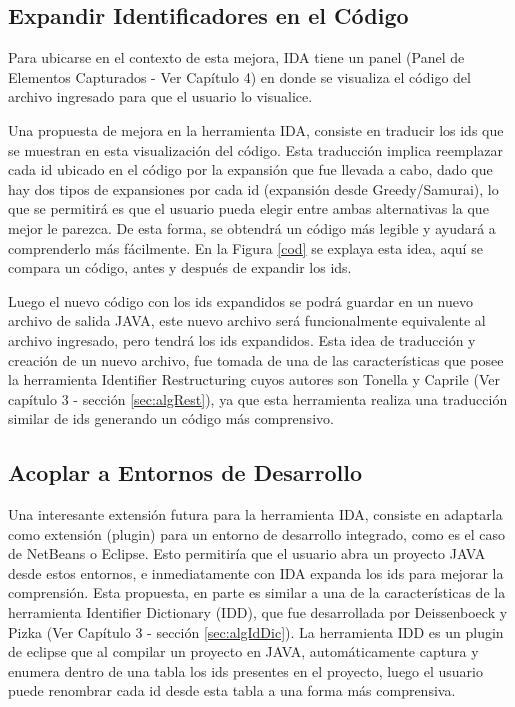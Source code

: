 \subsection{Expandir Identificadores en el Código}

Para ubicarse en el contexto de esta mejora, IDA tiene un panel (Panel de Elementos Capturados - Ver Capítulo 4) en donde se visualiza el código del archivo ingresado para que el usuario lo visualice. 


Una propuesta de mejora en la herramienta IDA, consiste en traducir los ids que se muestran en esta visualización del código.
Esta traducción implica reemplazar cada id ubicado en el código por la expansión que fue llevada a cabo, dado que hay dos tipos de expansiones por cada id (expansión desde Greedy/Samurai), lo que se permitirá es que el usuario pueda elegir entre ambas alternativas la que mejor le parezca. De esta forma, se obtendrá un código más legible y ayudará a comprenderlo más fácilmente. En la Figura \ref{cod} se explaya esta idea, aquí se compara un código, antes y después de expandir los ids.

Luego el nuevo código con los ids expandidos se podrá guardar en un nuevo archivo de salida JAVA, este nuevo archivo será funcionalmente equivalente al archivo ingresado, pero tendrá los ids expandidos. Esta idea de traducción y creación de un nuevo archivo, fue tomada de una de las características que posee la herramienta Identifier Restructuring cuyos autores son Tonella y Caprile (Ver capítulo 3 - sección \ref{sec:algRest}), ya que esta herramienta realiza una traducción similar de ids generando un código más comprensivo.

\subsection{Acoplar a Entornos de Desarrollo}

Una interesante extensión futura para la herramienta IDA, consiste en adaptarla como extensión (plugin) para un entorno de desarrollo integrado, como es el caso de NetBeans o Eclipse. Esto permitiría que el usuario abra un proyecto JAVA desde estos entornos, e inmediatamente con IDA expanda los ids para mejorar la comprensión. Esta propuesta, en parte es similar a una de la características de la herramienta Identifier Dictionary (IDD), que fue desarrollada por Deissenboeck y Pizka (Ver Capítulo 3 - sección \ref{sec:algIdDic}). La herramienta IDD es un plugin de eclipse que al compilar un proyecto en JAVA, automáticamente captura y enumera dentro de una tabla los ids presentes en el proyecto, luego el usuario puede renombrar cada id desde esta tabla a una forma más comprensiva.

